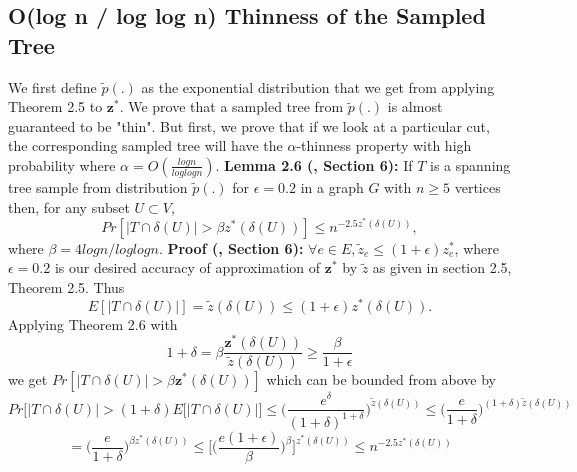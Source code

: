 \documentclass[oneside]{projectpaper} %
\begin{document}
\subsection{O(log n / log log n) Thinness of the Sampled Tree}
We first define $\tilde{p}(.)$ as the exponential distribution that we get from applying Theorem 2.5 to $\textbf{z}^*$. We prove that a sampled tree from $\tilde{p}(.)$ is almost guaranteed to be "thin". But first, we prove that if we look at a particular cut, the corresponding sampled tree will have the $\alpha$-thinness property with high probability where $\alpha = O(\frac{logn}{loglogn})$.
\newline
\newline
\textbf{Lemma 2.6 (\cite{AGM10}, Section 6):} If $T$ is a spanning tree sample from distribution $\tilde{p}(.)$ for $\epsilon = 0.2$ in a graph $G$ with $n \geq 5$ vertices then, for any subset $U \subset V$,
\begin{equation*}
Pr[|T \cap \delta(U)| > \beta z^*(\delta(U))] \leq n^{-2.5z^*(\delta(U))},
\end{equation*}
where $\beta = 4 logn / loglogn$.
\newline
\newline
\textbf{Proof (\cite{AGM10}, Section 6):} $\forall e \in E, \tilde{z}_e \leq (1 + \epsilon)z_{e}^{*}$, where $\epsilon = 0.2$ is our desired accuracy of approximation of $\textbf{z}^*$ by $\tilde{z}$ as given in section 2.5, Theorem 2.5. Thus
\begin{equation*}
E[|T \cap \delta(U)|] = \tilde{z}(\delta(U)) \leq (1 + \epsilon)z^*(\delta(U)).
\end{equation*}
Applying Theorem 2.6 with
\begin{equation*}
1 + \delta = \beta \frac{\textbf{z}^*(\delta(U))}{\tilde{z}(\delta(U))} \geq \frac{\beta}{1 + \epsilon}
\end{equation*}
we get $Pr[|T \cap \delta(U)| > \beta \textbf{z}^*(\delta(U))]$ which can be bounded from above by
\begin{equation*}
Pr\Big[|T \cap \delta(U)| > (1 + \delta)E[|T \cap \delta(U)|\Big] \leq \bigg(\frac{e^{\delta}}{(1 + \delta)^{1 + \delta}}\bigg)^{\tilde{z}(\delta(U))} \leq \bigg(\frac{e}{1 + \delta}\bigg)^{(1 + \delta)\tilde{z}(\delta(U))}
\end{equation*}
\begin{equation*}
= \bigg(\frac{e}{1 + \delta}\bigg)^{\beta z^*(\delta(U))} \leq \Bigg[\bigg(\frac{e(1 + \epsilon)}{\beta}\bigg)^\beta\Bigg]^{z^*(\delta(U))} \leq n^{-2.5z^*(\delta(U))}
\end{equation*}
\end{document}
